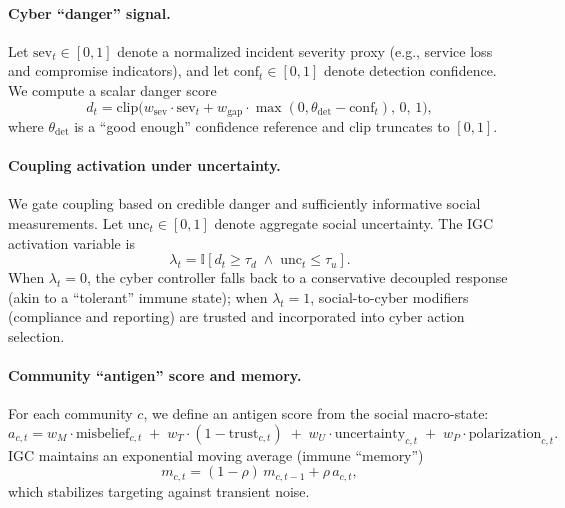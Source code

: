 \documentclass[biomimetics,article,submit,pdftex,moreauthors]{Definitions/mdpi}
\begin{document}
\paragraph{Cyber ``danger'' signal.}
Let $\mathrm{sev}_t \in [0,1]$ denote a normalized incident severity proxy (e.g., service loss and compromise indicators), and let $\mathrm{conf}_t \in [0,1]$ denote detection confidence.
We compute a scalar danger score
\begin{equation}
d_t = \mathrm{clip}\big(w_{\mathrm{sev}}\cdot \mathrm{sev}_t + w_{\mathrm{gap}}\cdot \max(0, \theta_{\mathrm{det}} - \mathrm{conf}_t),\, 0,\, 1\big),
\end{equation}
where $\theta_{\mathrm{det}}$ is a ``good enough'' confidence reference and $\mathrm{clip}$ truncates to $[0,1]$.

\paragraph{Coupling activation under uncertainty.}
We gate coupling based on credible danger and sufficiently informative social measurements.
Let $\mathrm{unc}_t \in [0,1]$ denote aggregate social uncertainty.
The IGC activation variable is
\begin{equation}
\lambda_t = \mathbb{I}\!\left[d_t \ge \tau_d \;\wedge\; \mathrm{unc}_t \le \tau_u\right].
\end{equation}
When $\lambda_t = 0$, the cyber controller falls back to a conservative decoupled response (akin to a ``tolerant'' immune state); when $\lambda_t = 1$, social-to-cyber modifiers (compliance and reporting) are trusted and incorporated into cyber action selection.

\paragraph{Community ``antigen'' score and memory.}
For each community $c$, we define an antigen score from the social macro-state:
\begin{equation}
a_{c,t} = w_M \cdot \mathrm{misbelief}_{c,t} \;+\; w_T \cdot (1-\mathrm{trust}_{c,t}) \;+\; w_U \cdot \mathrm{uncertainty}_{c,t} \;+\; w_P \cdot \mathrm{polarization}_{c,t}.
\end{equation}
IGC maintains an exponential moving average (immune ``memory'')
\begin{equation}
m_{c,t} = (1-\rho)\,m_{c,t-1} + \rho\,a_{c,t},
\end{equation}
which stabilizes targeting against transient noise.
\end{document}
